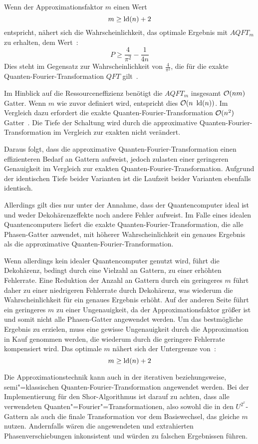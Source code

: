 Wenn der Approximationsfaktor \(m\) einen Wert
\[m \geq \operatorname{ld}(n)+2\]
entspricht, nähert sich die Wahrscheinlichkeit, das optimale Ergebnis mit \(AQFT_m\)
zu erhalten, dem Wert~\cite{cheung2004improved}: 
\[P \geq \frac{4}{\pi^2} - \frac{1}{4n}\]
Dies steht im Gegensatz zur Wahrscheinlichkeit von \(\frac{4}{\pi^2}\), 
die für die exakte Quanten-Fourier-Transformation \(QFT\) gilt~\cite{cheung2004improved}\cite[119]{kaye2007introduction}.

Im Hinblick auf die Ressourceneffizienz benötigt die \(AQFT_m\) insgesamt \(\operatorname{\mathcal{O}}(nm)\) Gatter.
Wenn \(m\) wie zuvor definiert wird, entspricht dies \(\operatorname{\mathcal{O}}(n~\operatorname{ld}(n))\). 
Im Vergleich dazu erfordert die exakte Quanten-Fourier-Transformation \(\operatorname{\mathcal{O}}(n^2)\) Gatter~\cite{Barenco_1996}.
Die Tiefe der Schaltung wird durch die approximative Quanten-Fourier-Transformation im Vergleich zur exakten nicht verändert.

Daraus folgt, dass die approximative Quanten-Fourier-Transformation einen effizienteren Bedarf an Gattern aufweist, 
jedoch zulasten einer geringeren Genauigkeit im Vergleich zur exakten Quanten-Fourier-Transformation.
Aufgrund der identischen Tiefe beider Varianten ist die Laufzeit beider Varianten ebenfalls identisch.

Allerdings gilt dies nur unter der Annahme, 
dass der Quantencomputer ideal ist und weder Dekohärenzeffekte noch andere Fehler aufweist.
Im Falle eines idealen Quantencomputers liefert die exakte Quanten-Fourier-Transformation, die alle Phasen-Gatter anwendet, 
mit höherer Wahrscheinlichkeit ein genaues Ergebnis als die approximative Quanten-Fourier-Transformation.

Wenn allerdings kein idealer Quantencomputer genutzt wird, 
führt die Dekohärenz, 
bedingt durch eine Vielzahl an Gattern, 
zu einer erhöhten Fehlerrate.
Eine Reduktion der Anzahl an Gattern durch ein geringeres 
\(m\) führt daher zu einer niedrigeren Fehlerrate durch Dekohärenz, 
was wiederum die Wahrscheinlichkeit für ein genaues Ergebnis erhöht.
Auf der anderen Seite führt ein geringeres \(m\) zu einer Ungenauigkeit,
da der Approximationsfaktor größer ist und somit nicht alle Phasen-Gatter angewendet werden.
Um das bestmögliche Ergebnis zu erzielen, 
muss eine gewisse Ungenauigkeit durch die Approximation in Kauf genommen werden, 
die wiederum durch die geringere Fehlerrate kompensiert wird. 
Das optimale \(m\) nähert sich der Untergrenze von~\cite{Barenco_1996}:
\[m \geq \operatorname{ld}(n)+2\]

Die Approximationstechnik kann auch in der iterativen beziehungsweise, 
semi"=klassisch\-en Quanten-Fourier-Transformation angewendet werden. 
Bei der Implementierung für den Shor-Algorithmus ist darauf zu achten, 
dass alle verwendeten Quanten"=Fourier"=Transformationen, also sowohl die in den \(U^{2^x}\)-Gattern als auch die finale Transformation vor dem Basiswechsel, 
das gleiche \(m\) nutzen.
Andernfalls wären die angewendeten und extrahierten Phasenverschiebungen inkonsistent 
und würden zu falschen Ergebnissen führen.

